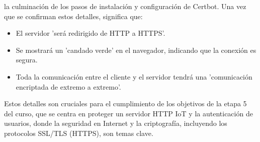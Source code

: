 \documentclass{report}
\begin{document}
la culminación de los pasos de instalación y configuración de Certbot. Una vez que se confirman estos detalles, significa que:
\begin{itemize}
    \item El servidor 'será redirigido de HTTP a HTTPS'.
    \item Se mostrará un 'candado verde' en el navegador, indicando que la conexión es segura.
    \item Toda la comunicación entre el cliente y el servidor tendrá una 'comunicación encriptada de extremo a extremo'.
\end{itemize}
Estos detalles son cruciales para el cumplimiento de los objetivos de la etapa 5 del curso, que se centra en proteger un servidor HTTP IoT 
y la autenticación de usuarios, donde la seguridad en Internet y la criptografía, incluyendo los protocolos SSL/TLS (HTTPS), son temas clave.
\end{document}

